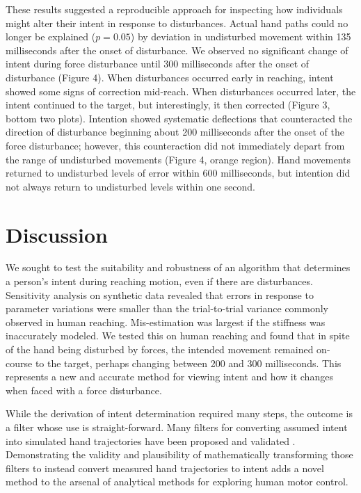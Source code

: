 These results suggested a reproducible approach for inspecting how individuals might alter their intent in response to disturbances. Actual hand paths could no longer be explained ($p=0.05$) by deviation in undisturbed movement within 135 milliseconds after the onset of disturbance. We observed no significant change of intent during force disturbance until 300 milliseconds after the onset of disturbance (Figure 4). When disturbances occurred early in reaching, intent showed some signs of correction mid-reach. When disturbances occurred later, the intent continued to the target, but interestingly, it then corrected (Figure 3, bottom two plots). Intention showed systematic deflections that counteracted the direction of disturbance beginning about 200 milliseconds after the onset of the force disturbance; however, this counteraction did not immediately depart from the range of undisturbed movements (Figure 4, orange region). Hand movements returned to undisturbed levels of error within 600 milliseconds, but intention did not always return to undisturbed levels within one second.

\section*{Discussion}
We sought to test the suitability and robustness of an algorithm that determines a person's intent during reaching motion, even if there are disturbances. Sensitivity analysis on synthetic data revealed that errors in response to parameter variations were smaller than the trial-to-trial variance commonly observed in human reaching. Mis-estimation was largest if the stiffness was inaccurately modeled. We tested this on human reaching and found that in spite of the hand being disturbed by forces, the intended movement remained on-course to the target, perhaps changing between 200 and 300 milliseconds. This represents a new and accurate method for viewing intent and how it changes when faced with a force disturbance.

While the derivation of intent determination required many steps, the outcome is a filter whose use is straight-forward. Many filters for converting assumed intent into simulated hand trajectories have been proposed and validated \cite{shadmehr1994adaptive, franklin2003adaptation, burdet2006stability}. Demonstrating the validity and plausibility of mathematically transforming those filters to instead convert measured hand trajectories to intent adds a novel method to the arsenal of analytical methods for exploring human motor control.

